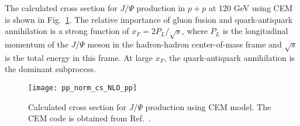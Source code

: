 The calculated cross section for $J/\Psi$ production in $p+p$ at 120 GeV using 
CEM is shown in Fig.\ \ref{fig:cem_cs}. The relative importance of gluon fusion 
and quark-antiquark annihilation is a strong function of $x_F=2P_L/\sqrt{s}$, 
where $P_L$ is the longitudinal momentum of the $J/\Psi$ meson in the 
hadron-hadron center-of-mass frame and $\sqrt{s}$ is the total energy in this 
frame. At large $x_F$, the quark-antiquark annihilation is the dominant subprocess.  
\begin{figure}[h!]
    \centering
    \texttt{[image: pp\_norm\_cs\_NLO\_pp]}
    \caption{Calculated cross section for $J/\Psi$ production using CEM model. 
		The CEM code is obtained from Ref.\ \cite{mangano1993}.}
    \label{fig:cem_cs}
\end{figure}

